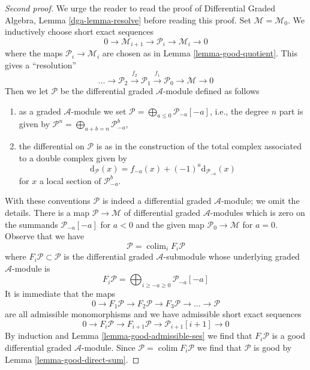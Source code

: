 \documentclass{stacks-project}
\theoremstyle{plain}
\theoremstyle{definition}
\theoremstyle{remark}
\numberwithin{equation}{subsection}
\def\colim{\mathop{\mathrm{colim}}\nolimits}
\begin{document}
\begin{proof}[Second proof]
We urge the reader to read the proof of Differential Graded Algebra,
Lemma \ref{dga-lemma-resolve} before reading this proof.
Set $\mathcal{M} = \mathcal{M}_0$.
We inductively choose short exact sequences
$$
0 \to \mathcal{M}_{i + 1} \to \mathcal{P}_i \to \mathcal{M}_i \to 0
$$
where the maps
$\mathcal{P}_i \to \mathcal{M}_i$ are chosen as in
Lemma \ref{lemma-good-quotient}.
This gives a ``resolution''
$$
\ldots \to \mathcal{P}_2 \xrightarrow{f_2}
\mathcal{P}_1 \xrightarrow{f_1} \mathcal{P}_0 \to \mathcal{M} \to 0
$$
Then we let $\mathcal{P}$ be the differential graded
$\mathcal{A}$-module defined as follows
\begin{enumerate}
\item as a graded $\mathcal{A}$-module we set
$\mathcal{P} = \bigoplus_{a \leq 0} \mathcal{P}_{-a}[-a]$, i.e.,
the degree $n$ part is given by
$\mathcal{P}^n = \bigoplus\nolimits_{a + b = n} \mathcal{P}_{-a}^b$,
\item the differential on $\mathcal{P}$ is as in the construction of
the total complex associated to a double complex given by
$$
\text{d}_\mathcal{P}(x) = f_{-a}(x) + (-1)^a \text{d}_{\mathcal{P}_{-a}}(x)
$$
for $x$ a local section of $\mathcal{P}_{-a}^b$.
\end{enumerate}
With these conventions $\mathcal{P}$ is indeed a
differential graded $\mathcal{A}$-module; we omit the details.
There is a map $\mathcal{P} \to \mathcal{M}$ of differential graded
$\mathcal{A}$-modules which is zero on the summands $\mathcal{P}_{-a}[-a]$
for $a < 0$ and the given map $\mathcal{P}_0 \to \mathcal{M}$ for $a = 0$.
Observe that we have
$$
\mathcal{P} = \colim_i F_i\mathcal{P}
$$
where $F_i\mathcal{P} \subset \mathcal{P}$ is the differential
graded $\mathcal{A}$-submodule whose underlying graded $\mathcal{A}$-module
is
$$
F_i\mathcal{P} =
\bigoplus\nolimits_{i \geq -a \geq 0} \mathcal{P}_{-a}[-a]
$$
It is immediate that the maps
$$
0 \to F_1\mathcal{P} \to F_2\mathcal{P} \to F_3\mathcal{P} \to
\ldots \to \mathcal{P}
$$
are all admissible monomorphisms and we have admissible short exact sequences
$$
0 \to F_i\mathcal{P} \to
F_{i + 1}\mathcal{P} \to
\mathcal{P}_{i + 1}[i + 1] \to 0
$$
By induction and Lemma \ref{lemma-good-admissible-ses}
we find that $F_i\mathcal{P}$ is a good differential graded
$\mathcal{A}$-module. Since $\mathcal{P} = \colim F_i\mathcal{P}$
we find that $\mathcal{P}$ is good by Lemma \ref{lemma-good-direct-sum}.


\end{proof}
\end{document}
